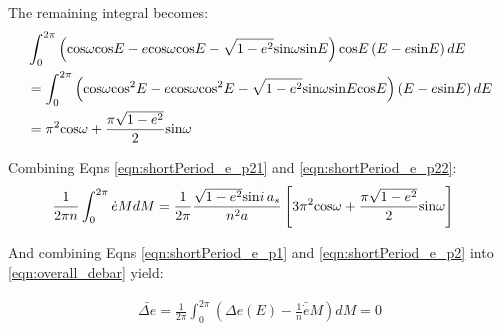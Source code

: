 \documentclass[]{aiaa-tc}%
\begin{document}
The remaining integral becomes:
	\begin{equation} 
\begin{aligned}
& \int_{0}^{2\pi} \left ( \textup{cos}\omega \textup{cos}E -e\textup{cos}\omega \textup{cos}E -\sqrt{1-e^2}\textup{sin}\omega \textup{sin}E \right )\textup{cos}E\left ( E-e\textup{sin}E \right )dE \\
 &= \int_{0}^{2\pi} \left ( \textup{cos}\omega \textup{cos}^2E -e\textup{cos}\omega \textup{cos}^2E -\sqrt{1-e^2}\textup{sin}\omega \textup{sin}E\textup{cos}E \right )\left ( E-e\textup{sin}E \right )dE \\
 &= \pi^2\textup{cos}\omega + \frac{\pi \sqrt{1-e^2}}{2}\textup{sin}\omega \\ 
\end{aligned}
\label{eqn:shortPeriod_e_p22}
	\end{equation} 

Combining Eqns \ref{eqn:shortPeriod_e_p21} and \ref{eqn:shortPeriod_e_p22}:
	\begin{equation} 
\begin{aligned}
\frac{1}{2\pi n}\int_{0}^{2\pi}\dot{e}MdM &=\frac{1}{2\pi}\frac{\sqrt{1-e^2}\textup{\textup{sin}}i\,a_s}{n^2a}\left [ 3\pi^2\textup{cos}\omega + \frac{\pi \sqrt{1-e^2}}{2}\textup{sin}\omega \right ]
\end{aligned}
\label{eqn:shortPeriod_e_p2}
	\end{equation} 

And combining Eqns \ref{eqn:shortPeriod_e_p1} and \ref{eqn:shortPeriod_e_p2} into \ref{eqn:overall_debar} yield:

	\begin{equation} 
\begin{aligned}
\bar{\Delta e} = \frac{1}{2\pi}\int_{0}^{2\pi}\left (\Delta e(E) -\frac{1}{n}\bar{\dot{e}}M \right ) dM =0
 \end{aligned}
\label{eqn:overall_debar}
	\end{equation} 
\end{document}

